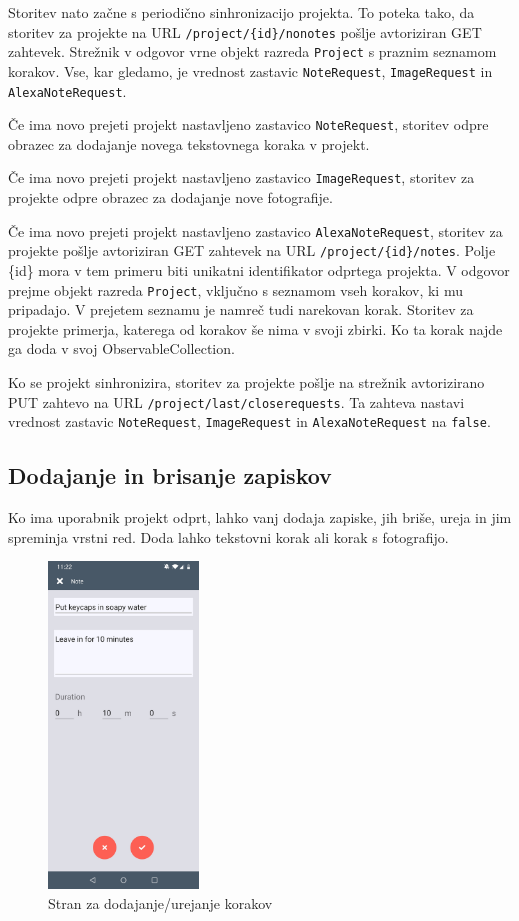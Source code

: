 \documentclass[a4paper, 12pt]{book}
\begin{document}
Storitev nato začne s periodično sinhronizacijo projekta.
To poteka tako, da storitev za projekte na URL \texttt{/project/\{id\}/nonotes} pošlje avtoriziran GET zahtevek.
Strežnik v odgovor vrne objekt razreda \texttt{Project} s praznim seznamom korakov.
Vse, kar gledamo, je vrednost zastavic \texttt{NoteRequest}, \texttt{ImageRequest} in \texttt{AlexaNoteRequest}.

Če ima novo prejeti projekt nastavljeno zastavico \texttt{NoteRequest}, storitev odpre obrazec za dodajanje novega tekstovnega koraka v projekt.

Če ima novo prejeti projekt nastavljeno zastavico \texttt{ImageRequest}, storitev za projekte odpre obrazec za dodajanje nove fotografije.

Če ima novo prejeti projekt nastavljeno zastavico \texttt{AlexaNoteRequest}, storitev za projekte pošlje avtoriziran GET zahtevek na URL \texttt{/project/\{id\}/notes}.
Polje \{id\} mora v tem primeru biti unikatni identifikator odprtega projekta.
V odgovor prejme objekt razreda \texttt{Project}, vključno s seznamom vseh korakov, ki mu pripadajo.
V prejetem seznamu je namreč tudi narekovan korak.
Storitev za projekte primerja, katerega od korakov še nima v svoji zbirki.
Ko ta korak najde ga doda v svoj ObservableCollection.

Ko se projekt sinhronizira, storitev za projekte pošlje na strežnik avtorizirano PUT zahtevo na URL \texttt{/project/last/closerequests}.
Ta zahteva nastavi vrednost zastavic \texttt{NoteRequest}, \texttt{ImageRequest} in \texttt{AlexaNoteRequest} na \texttt{false}.


\subsection{Dodajanje in brisanje zapiskov}

Ko ima uporabnik projekt odprt, lahko vanj dodaja zapiske, jih briše, ureja in jim spreminja vrstni red.
Doda lahko tekstovni korak ali korak s fotografijo.

\begin{figure}[H]
\begin{center}
	\includegraphics[width=4cm]{app_note}
\end{center}
	\caption{Stran za dodajanje/urejanje korakov}
\label{app_note}
\end{figure}
\end{document}

